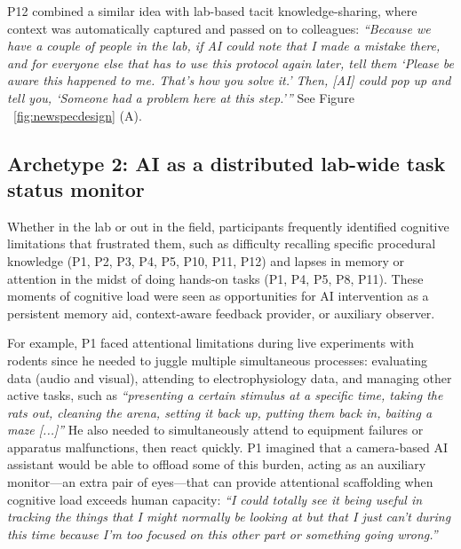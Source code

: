 P12 combined a similar idea with lab-based tacit knowledge-sharing, where context was automatically captured and passed on to colleagues: \textit{``Because we have a couple of people in the lab, if AI could note that I made a mistake there, and for everyone else that has to use this protocol again later, tell them `Please be aware this happened to me. That's how you solve it.' Then, [AI] could pop up and tell you, `Someone had a problem here at this step.'''} See Figure ~\ref{fig:newspecdesign} (A).


\subsection{\textbf{Archetype 2: AI as a distributed lab-wide task status monitor}} Whether in the lab or out in the field, participants frequently identified cognitive limitations that frustrated them, such as difficulty recalling specific procedural knowledge (P1, P2, P3, P4, P5, P10, P11, P12) and lapses in memory or attention in the midst of doing hands-on tasks (P1, P4, P5, P8, P11). These moments of cognitive load were seen as opportunities for AI intervention as a persistent memory aid, context-aware feedback provider, or auxiliary observer.

For example, P1 faced attentional limitations during live experiments with rodents since he needed to juggle multiple simultaneous processes: evaluating data (audio and visual), attending to electrophysiology data, and managing other active tasks, such as \textit{``presenting a certain stimulus at a specific time, taking the rats out, cleaning the arena, setting it back up, putting them back in, baiting a maze [...]''} He also needed to simultaneously attend to equipment failures or apparatus malfunctions, then react quickly. P1 imagined that a camera-based AI assistant would be able to offload some of this burden, acting as an auxiliary monitor---an extra pair of eyes---that can provide attentional scaffolding when cognitive load exceeds human capacity: \textit{``I could totally see it being useful in tracking the things that I might normally be looking at but that I just can't during this time because I'm too focused on this other part or something going wrong.''}

